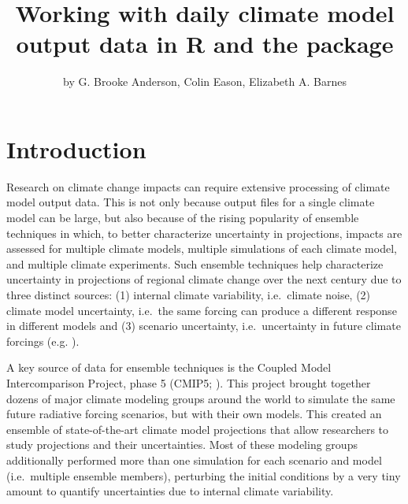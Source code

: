 \title{Working with daily climate model output data in R and the
 package}
\author{by G. Brooke Anderson, Colin Eason, Elizabeth A. Barnes}

\maketitle


\section{Introduction}\label{introduction}

Research on climate change impacts can require extensive processing of
climate model output data. This is not only because output files for a
single climate model can be large, but also because of the rising
popularity of ensemble techniques \citep{IPCCch1} in which, to better
characterize uncertainty in projections, impacts are assessed for
multiple climate models, multiple simulations of each climate model, and
multiple climate experiments. Such ensemble techniques help characterize
uncertainty in projections of regional climate change over the next
century due to three distinct sources: (1) internal climate variability,
i.e.~climate noise, (2) climate model uncertainty, i.e.~the same forcing
can produce a different response in different models and (3) scenario
uncertainty, i.e.~uncertainty in future climate forcings (e.g.
\citet{hawkins2009potential}).

A key source of data for ensemble techniques is the Coupled Model
Intercomparison Project, phase 5 (CMIP5; \citet{taylor2012overview}).
This project brought together dozens of major climate modeling groups
around the world to simulate the same future radiative forcing
scenarios, but with their own models. This created an ensemble of
state-of-the-art climate model projections that allow researchers to
study projections and their uncertainties. Most of these modeling groups
additionally performed more than one simulation for each scenario and
model (i.e.~multiple ensemble members), perturbing the initial
conditions by a very tiny amount to quantify uncertainties due to
internal climate variability.

